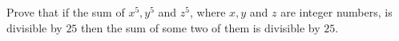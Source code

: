 Prove that if the sum of $x^5,y^5$ and $z^5$, where $x,y$ and $z$ are integer numbers, is divisible by $25$ then the sum of some two of them is divisible by $25$.